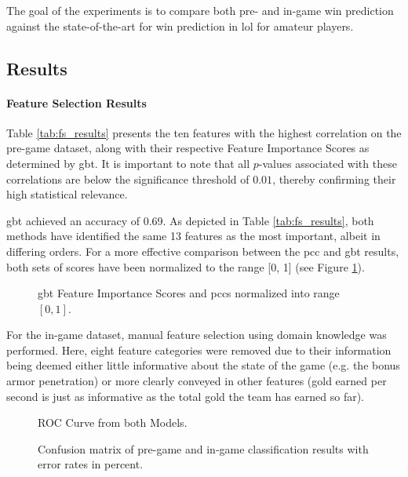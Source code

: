 \documentclass[12pt, a4paper, headinclude, twoside, plainheadsepline, open=right, numbers=noenddot, hidelinks, toc=listof, toc=bibliography]{scrreprt}
\begin{document}
The goal of the experiments is to compare both pre- and in-game win prediction against the state-of-the-art for win prediction in \acl{lol} for amateur players.

\subsection{Results}
\label{ssec:results}


\paragraph{Feature Selection Results}
Table \ref{tab:fs_results} presents the ten features with the highest correlation on the pre-game dataset, along with their respective Feature Importance Scores as determined by \ac{gbt}.
It is important to note that all $p$-values associated with these correlations are below the significance threshold of $0.01$, thereby confirming their high statistical relevance.


\Ac{gbt} achieved an accuracy of 0.69.
As depicted in Table \ref{tab:fs_results}, both methods have identified the same 13 features as the most important, albeit in differing orders.
For a more effective comparison between the \ac{pcc} and \ac{gbt} results, both sets of scores have been normalized to the range [0, 1] (see Figure \ref{fig:fs_norm}).

\begin{figure}
\centering
\resizebox{\textwidth}{!}{%
	
}
\caption{\ac{gbt} Feature Importance Scores and \acp{pcc} normalized into range $[0, 1]$.}
\label{fig:fs_norm}
\end{figure}



For the in-game dataset, manual feature selection using domain knowledge was performed.
Here, eight feature categories were removed  due to their information being deemed either little informative about the state of the game (e.g. the bonus armor penetration) or more clearly conveyed in other features (gold earned per second is just as informative as the total gold the team has earned so far).


\begin{figure}[ht]
\centering

\caption{ROC Curve from both Models.}
\label{fig:roc}
\end{figure}

\begin{figure}[ht]
\centering

\caption{Confusion matrix of pre-game and in-game classification results with error rates in percent.}
\label{fig:cm_static}
\end{figure}
\end{document}
